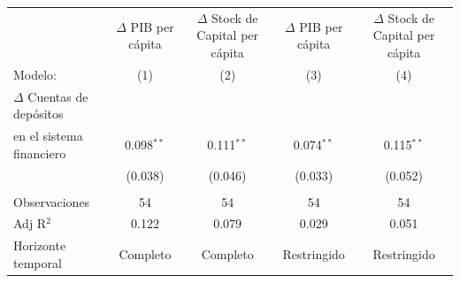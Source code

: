 \begingroup
\centering
\begin{tabular}{lcccc}
   \tabularnewline \midrule \midrule
                                             & $\Delta$ PIB per cápita  & \makecell{$\Delta$ Stock de Capital \\per cápita}     & $\Delta$ PIB per cápita  & \makecell{$\Delta$ Stock de Capital \\per cápita}\\      
   Modelo:                                                       & (1)                      & (2)                                                   & (3)                      & (4)\\  
   \midrule
 
   $\Delta$ Cuentas de depósitos \\ en el sistema financiero    & 0.098$^{**}$             & 0.111$^{**}$                                          & 0.074$^{**}$             & 0.115$^{**}$\\   
                                                                & (0.038)                  & (0.046)                                               & (0.033)                  & (0.052)\\   
\tabularnewline
   Observaciones                                                 & 54                       & 54                                                    & 54                       & 54\\  
   Adj R$^2$                                               & 0.122                    & 0.079                                                 & 0.029                    & 0.051\\  
Horizonte temporal & Completo & Completo & Restringido & Restringido \\  
   \midrule \midrule
\end{tabular}
\par\endgroup
